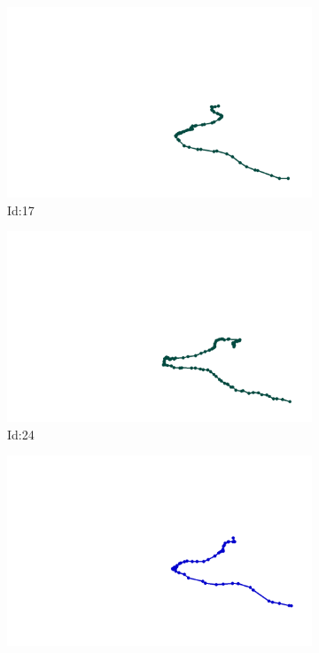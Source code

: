 \documentclass[12pt,twoside]{report}
\begin{document}
\begin{figure}
\centering
\begin{subfigure}[b]{0.20\textwidth}
\centering
\includegraphics[width=\textwidth]{../trajectories/17.png}
\caption{Id:17}
\end{subfigure}
\begin{subfigure}[b]{0.20\textwidth}
\centering
\includegraphics[width=\textwidth]{../trajectories/24.png}
\caption{Id:24}
\end{subfigure}
\begin{subfigure}[b]{0.20\textwidth}
\centering
\includegraphics[width=\textwidth]{../trajectories/25.png}

\end{subfigure}
\end{figure}
\end{document}
